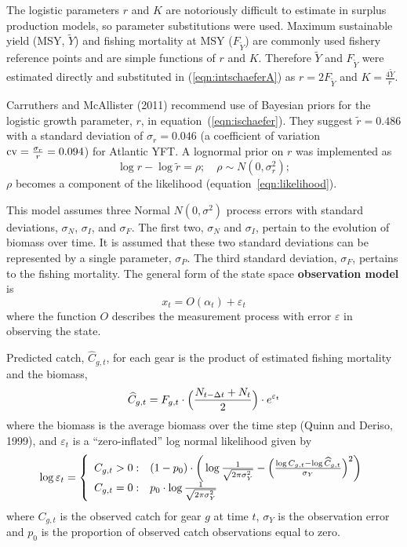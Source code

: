 \documentclass[12pt,letterpaper]{article}
\newcommand\MSY{\widetilde{Y}}
\newcommand\Fmsy{F_{\MSY}}
\begin{document}
The logistic parameters $r$ and $K$ are notoriously difficult to estimate
in surplus production models, 
so parameter substitutions were used. 
Maximum sustainable yield
(MSY, $\MSY$) and fishing mortality at MSY ($\Fmsy$) are commonly used
fishery reference points and are simple functions of $r$ and $K$.
Therefore $\MSY$ and $\Fmsy$ were
estimated directly and substituted in (\ref{eqn:intschaeferA}) as
$r=2\Fmsy$ and $K=\frac{4\MSY}{r}$.

Carruthers and McAllister (2011) recommend use of Bayesian priors for the
logistic growth parameter, $r$, in equation~(\ref{eqn:ischaefer}). They
suggest $\tilde{r} = 0.486$ with a standard deviation of $\sigma_r = 0.046$
(a coefficient of variation ${\rm cv}=\frac{\sigma_r}{r}=0.094$)
for Atlantic YFT.
A lognormal prior on $r$ was implemented as 
\begin{equation}
\log r - \log \tilde{r} = \rho ;\quad \rho\sim N(0,\sigma^2_r);
\end{equation}
$\rho$ becomes a component of the likelihood
(equation~\ref{eqn:likelihood}).

This model assumes three Normal $N(0,\sigma^2)$ process errors with
standard deviations, $\sigma_N$, $\sigma_I$, and $\sigma_F$. The first
two, $\sigma_N$ and $\sigma_I$, pertain to the evolution of biomass over
time. It is assumed that these two standard deviations can be
represented by a single parameter, $\sigma_P$. The third standard
deviation, $\sigma_F$, pertains to the fishing mortality.
\goodbreak
The general form of the state space {\bf observation model} is
\begin{equation}
x_t = O(\alpha_t) + \varepsilon_t
\end{equation}
where the function $O$ describes the measurement process with
error $\varepsilon$ in observing the state.

Predicted catch, $\widehat{C}_{g,t}$, for each gear is the product of
estimated fishing mortality and the biomass,
\begin{equation}
\widehat{C}_{g,t} = F_{g,t}\cdot\Bigl(\frac{N_{t-\Delta
t}+N_t}{2}\Bigr) \cdot e^{\varepsilon_t}
\label{eqn:obs1}
\end{equation}
where the biomass is  the average
biomass over the time step (Quinn and Deriso, 1999), and
$\varepsilon_t$ is a ``zero-inflated'' log normal likelihood given by
\begin{equation}
  \log \varepsilon_t = \left\{
    \begin{array}{r@{\;:\quad}l}
       C_{g,t} > 0 &
(1-p_0)\cdot\bigg(\log\frac{1}{\sqrt{2\pi\sigma^2_Y}}
          -\Bigl(\frac{\log
C_{g,t}-\log\widehat{C}_{g,t}}{\sigma_Y}\Bigr)^2\bigg)\\
       C_{g,t} = 0 & p_0 \cdot\log \frac{1}{\sqrt{2\pi\sigma^2_Y}}\\
    \end{array}
  \right.
\end{equation}
where $C_{g,t}$ is the observed catch for gear $g$ at time $t$,
$\sigma_Y$ is the observation error and
$p_0$ is the proportion of observed catch observations equal to zero.
\end{document}

